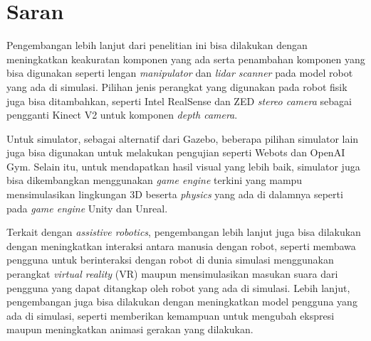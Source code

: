 \section{Saran}
\label{chap:saran}

Pengembangan lebih lanjut dari penelitian ini bisa dilakukan dengan meningkatkan keakuratan komponen yang ada serta penambahan komponen yang bisa digunakan seperti lengan \emph{manipulator} dan \emph{lidar scanner} pada model robot yang ada di simulasi.
Pilihan jenis perangkat yang digunakan pada robot fisik juga bisa ditambahkan,
  seperti Intel RealSense dan ZED \emph{stereo camera} sebagai pengganti Kinect V2 untuk komponen \emph{depth camera}.

Untuk simulator, sebagai alternatif dari Gazebo,
  beberapa pilihan simulator lain juga bisa digunakan untuk melakukan pengujian seperti Webots dan OpenAI Gym.
Selain itu, untuk mendapatkan hasil visual yang lebih baik,
  simulator juga bisa dikembangkan menggunakan \emph{game engine} terkini yang mampu mensimulasikan lingkungan 3D beserta \emph{physics} yang ada di dalamnya seperti pada \emph{game engine} Unity dan Unreal.

Terkait dengan \emph{assistive robotics},
  pengembangan lebih lanjut juga bisa dilakukan dengan meningkatkan interaksi antara manusia dengan robot,
  seperti membawa pengguna  untuk berinteraksi dengan robot di dunia simulasi menggunakan perangkat \emph{virtual reality} (VR) maupun mensimulasikan masukan suara dari pengguna yang dapat ditangkap oleh robot yang ada di simulasi.
Lebih lanjut, pengembangan juga bisa dilakukan dengan meningkatkan model pengguna yang ada di simulasi, seperti memberikan kemampuan untuk mengubah ekspresi maupun meningkatkan animasi gerakan yang dilakukan.
